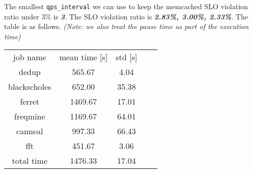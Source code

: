\documentclass[11pt]{article}
\begin{document}
\begin{enumerate}
    
    The smallest \texttt{qps\_interval} we can use to keep the memcached SLO violation ratio under 3\% is \emph{\textbf{3}}.
    The SLO violation ratio is \emph{\textbf{2.83\%, 3.00\%, 2.33\%}}.
    The table is as follows. \emph{(Note: we also treat the pause time as part of the  execution time)}
    
    \begin{table}[h]
        \centering
        \begin{tabular}{ |c|c|c|c|c|} 
        \hline
        job name & mean time [s] & std [s] \\
        \hhline{|=|=|=|}
        dedup         & 565.67 & 4.04 \\  \hline
        blackscholes  & 652.00 & 35.38 \\  \hline
        ferret        & 1469.67 &  17.01 \\  \hline
        freqmine      & 1169.67 & 64.01 \\  \hline
        canneal       & 997.33 &  66.43 \\  \hline
        fft           & 451.67 &  3.06 \\  \hline
        total time    & 1476.33 & 17.04 \\ \hline
        \end{tabular}
    \end{table}
    

\end{enumerate}
\end{document}
